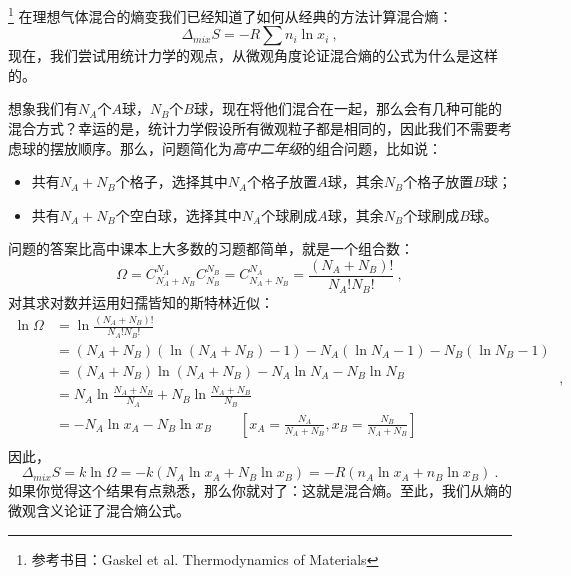 


\footnote{参考书目：Gaskel et al. Thermodynamics of Materials}
在理想气体混合的熵变我们已经知道了如何从经典的方法计算混合熵：
\begin{equation}
\Delta_{mix} S = - R \sum n_i \ln x_i~,
\end{equation}
现在，我们尝试用统计力学的观点，从微观角度论证混合熵的公式为什么是这样的。

想象我们有$N_A$个$A$球，$N_B$个$B$球，现在将他们混合在一起，那么会有几种可能的混合方式？幸运的是，统计力学假设所有微观粒子都是相同的，因此我们不需要考虑球的摆放顺序。那么，问题简化为\textsl{高中二年级}的组合问题，比如说：
\begin{itemize}
\item 共有$N_A+N_B$个格子，选择其中$N_A$个格子放置$A$球，其余$N_B$个格子放置$B$球；
\item 共有$N_A+N_B$个空白球，选择其中$N_A$个球刷成$A$球，其余$N_B$个球刷成$B$球。
\end{itemize}
问题的答案比高中课本上大多数的习题都简单，就是一个组合数：
\begin{equation}
\Omega = C^{N_A}_{N_A+N_B} C^{N_B}_{N_B} =  C^{N_A}_{N_A+N_B}  = \frac{(N_A+N_B)!}{N_A!N_B!}~,
\end{equation}
对其求对数并运用妇孺皆知的斯特林近似：
\begin{equation}
\begin{aligned}
\ln \Omega &= \ln \frac{(N_A+N_B)!}{N_A!N_B!} \\
 &= (N_A+N_B) (\ln (N_A+N_B) - 1) - N_A (\ln N_A - 1) - N_B (\ln N_B - 1) \\
 &= (N_A+N_B) \ln (N_A+N_B) - N_A \ln N_A - N_B \ln N_B \\
 &= N_A \ln \frac{N_A+N_B}{N_A} + N_B \ln \frac{N_A+N_B}{N_B} \\
 &= - N_A \ln x_A - N_B \ln x_B \qquad \left [x_A = \frac{N_A}{N_A+N_B}, x_B = \frac{N_B}{N_A+N_B} \right ]\\
\end{aligned}~,
\end{equation}
因此，
\begin{equation}
\Delta_{mix} S = k \ln \Omega = - k(N_A \ln x_A + N_B \ln x_B) = - R(n_A \ln x_A + n_B \ln x_B) ~.
\end{equation}
如果你觉得这个结果有点熟悉，那么你就对了：这就是混合熵。至此，我们从熵的微观含义论证了混合熵公式。
